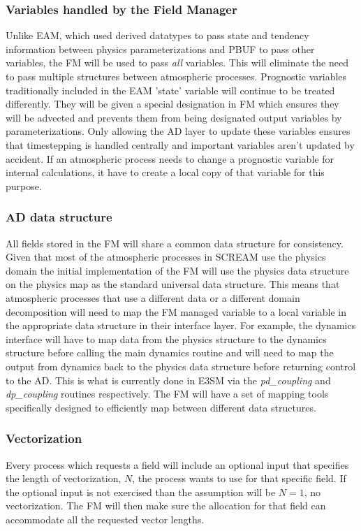 \subsubsection{Variables handled by the Field Manager}
Unlike EAM, which used derived datatypes to pass state and tendency information between physics parameterizations and PBUF to pass other variables, the FM will be used to pass \emph{all} variables.  This will eliminate the need to pass multiple structures between atmospheric processes.  Prognostic variables traditionally included in the EAM 'state' variable will continue to be treated differently. They will be given a special designation in FM which ensures they will be advected and prevents them from being designated output variables by parameterizations. Only allowing the AD layer to update these variables ensures that timestepping is handled centrally and important variables aren't updated by accident. If an atmospheric process needs to change a prognostic variable for internal calculations, it have to create a local copy of that variable for this purpose.

\subsubsection{AD data structure}
All fields stored in the FM will share a common data structure for consistency.  Given that most of the atmospheric processes in SCREAM use the physics domain the initial implementation of the FM will use the physics data structure on the physics map as the standard universal data structure.  This means that atmospheric processes that use a different data  or a different domain decomposition will need to map the FM managed variable to a local variable in the appropriate data structure in their interface layer.  For example, the dynamics interface will have to map data from the physics structure to the dynamics structure before calling the main dynamics routine and will need to map the output from dynamics back to the physics data structure before returning control to the AD.   This is what is currently done in E3SM via the \emph{pd\_coupling} and \emph{dp\_coupling} routines respectively.  The FM will have a set of mapping tools specifically designed to efficiently map between different data structures.

\subsubsection{Vectorization}
Every process which requests a field will include an optional input that specifies the length of vectorization, $N$, the process wants to use for that specific field.  If the optional input is not exercised than the assumption will be $N=1$, no vectorization.  The FM will then make sure the allocation for that field can accommodate all the requested vector lengths.


